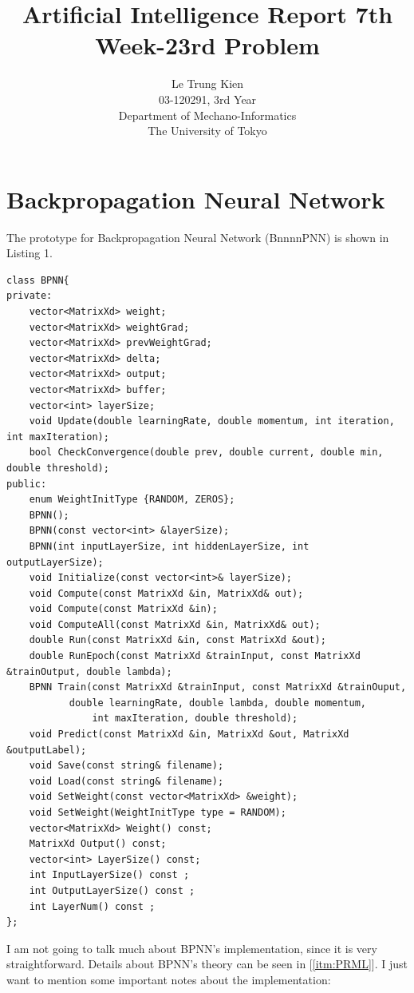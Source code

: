 \documentclass[a4paper, 11pt]{article}
\begin{document}
\title{Artificial Intelligence Report 7th Week-23rd Problem}
\author{Le Trung Kien\\ 
  03-120291, 3rd Year \\
  Department of Mechano-Informatics \\ 
  The University of Tokyo
}
\maketitle
\section{Backpropagation Neural Network}
The prototype for Backpropagation Neural Network (BnnnnPNN) is shown in Listing 1.
\begin{lstlisting}[caption={Backpropagation Neural Network Class (bpnn.hpp)}]
class BPNN{
private:
    vector<MatrixXd> weight;
    vector<MatrixXd> weightGrad;
    vector<MatrixXd> prevWeightGrad;
    vector<MatrixXd> delta;
    vector<MatrixXd> output;
    vector<MatrixXd> buffer;
    vector<int> layerSize;
    void Update(double learningRate, double momentum, int iteration, int maxIteration);
    bool CheckConvergence(double prev, double current, double min, double threshold);
public:
    enum WeightInitType {RANDOM, ZEROS};
    BPNN();
    BPNN(const vector<int> &layerSize);
    BPNN(int inputLayerSize, int hiddenLayerSize, int outputLayerSize);
    void Initialize(const vector<int>& layerSize);
    void Compute(const MatrixXd &in, MatrixXd& out);
    void Compute(const MatrixXd &in);
    void ComputeAll(const MatrixXd &in, MatrixXd& out);
    double Run(const MatrixXd &in, const MatrixXd &out);
    double RunEpoch(const MatrixXd &trainInput, const MatrixXd &trainOutput, double lambda);
    BPNN Train(const MatrixXd &trainInput, const MatrixXd &trainOuput, 
	       double learningRate, double lambda, double momentum, 
               int maxIteration, double threshold);
    void Predict(const MatrixXd &in, MatrixXd &out, MatrixXd &outputLabel);
    void Save(const string& filename);
    void Load(const string& filename);
    void SetWeight(const vector<MatrixXd> &weight);
    void SetWeight(WeightInitType type = RANDOM);
    vector<MatrixXd> Weight() const;
    MatrixXd Output() const;
    vector<int> LayerSize() const;
    int InputLayerSize() const ;
    int OutputLayerSize() const ;
    int LayerNum() const ;
};
\end{lstlisting}
I am not going to talk much about BPNN's implementation, since it is very straightforward. Details about BPNN's theory can be seen in [\ref{itm:PRML}]. I just want to mention some important notes about the implementation:
\end{document}

